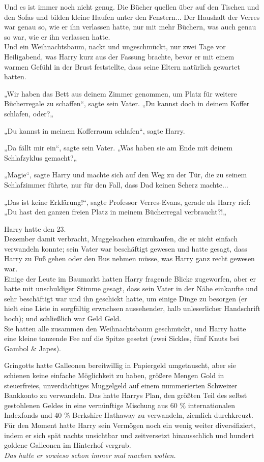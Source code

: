{Und es ist immer noch nicht genug. Die Bücher quellen über auf den Tischen und den Sofas und bilden kleine Haufen unter den Fenstern... Der Haushalt der Verres war genau so, wie er ihn verlassen hatte, nur mit mehr Büchern, was auch genau so war, wie er ihn verlassen hatte.\\ Und ein Weihnachtsbaum, nackt und ungeschmückt, nur zwei Tage vor Heiligabend, was Harry kurz aus der Fassung brachte, bevor er mit einem warmen Gefühl in der Brust feststellte, dass seine Eltern natürlich gewartet hatten.

„Wir haben das Bett aus deinem Zimmer genommen, um Platz für weitere Bücherregale zu schaffen“, sagte sein Vater. „Du kannst doch in deinem Koffer schlafen, oder?„

„Du kannst in meinem Kofferraum schlafen“, sagte Harry.

„Da fällt mir ein“, sagte sein Vater. „Was haben sie am Ende mit deinem Schlafzyklus gemacht?„

„Magie“, sagte Harry und machte sich auf den Weg zu der Tür, die zu seinem Schlafzimmer führte, nur für den Fall, dass Dad keinen Scherz machte...

„Das ist keine Erklärung!“, sagte Professor Verres-Evans, gerade als Harry rief:\\ „Du hast den ganzen freien Platz in meinem Bücherregal verbraucht?!„

Harry hatte den 23.\\ Dezember damit verbracht, Muggelsachen einzukaufen, die er nicht einfach verwandeln konnte; sein Vater war beschäftigt gewesen und hatte gesagt, dass Harry zu Fuß gehen oder den Bus nehmen müsse, was Harry ganz recht gewesen war.\\ Einige der Leute im Baumarkt hatten Harry fragende Blicke zugeworfen, aber er hatte mit unschuldiger Stimme gesagt, dass sein Vater in der Nähe einkaufte und sehr beschäftigt war und ihn geschickt hatte, um einige Dinge zu besorgen (er hielt eine Liste in sorgfältig erwachsen aussehender, halb unleserlicher Handschrift hoch); und schließlich war Geld Geld.\\ Sie hatten alle zusammen den Weihnachtsbaum geschmückt, und Harry hatte eine kleine tanzende Fee auf die Spitze gesetzt (zwei Sickles, fünf Knuts bei Gambol \& Japes).

Gringotts hatte Galleonen bereitwillig in Papiergeld umgetauscht, aber sie schienen keine einfache Möglichkeit zu haben, größere Mengen Gold in steuerfreies, unverdächtiges Muggelgeld auf einem nummerierten Schweizer Bankkonto zu verwandeln. Das hatte Harrys Plan, den größten Teil des selbst gestohlenen Geldes in eine vernünftige Mischung aus 60 \% internationalen Indexfonds und 40 \% Berkshire Hathaway zu verwandeln, ziemlich durchkreuzt. Für den Moment hatte Harry sein Vermögen noch ein wenig weiter diversifiziert, indem er sich spät nachts unsichtbar und zeitversetzt hinausschlich und hundert goldene Galleonen im Hinterhof vergrub.\\ \emph{Das hatte er sowieso schon immer mal machen wollen.}

}
